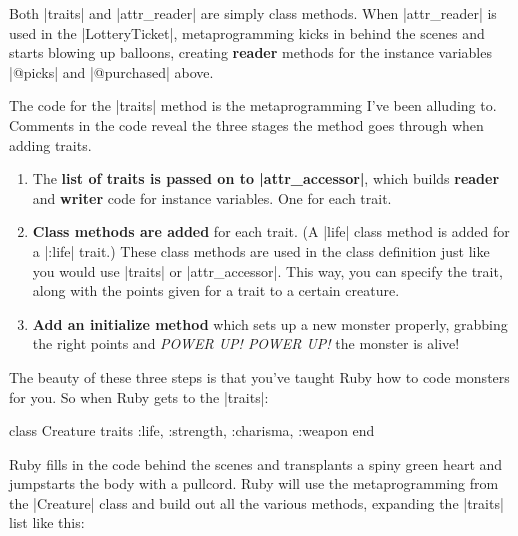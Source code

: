 \documentclass[12pt,twoside]{report}
\begin{document}
Both \rubyinline|traits| and
\rubyinline|attr_reader| are simply class methods.
When \rubyinline|attr_reader| is used in the
\rubyinline|LotteryTicket|, metaprogramming kicks in
behind the scenes and starts blowing up balloons, creating {\bf
  reader} methods for the instance variables
\rubyinline|@picks| and
\rubyinline|@purchased| above.

The code for the \rubyinline|traits| method is the
metaprogramming I've been alluding to. Comments in the code reveal the
three stages the method goes through when adding traits.

\begin{enumerate}
\item The {\bf list of traits is passed on to
  \rubyinline|attr_accessor|}, which builds {\bf
  reader} and {\bf writer} code for instance variables.  One for each
  trait.
\item {\bf Class methods are added} for each trait.  (A
  \rubyinline|life| class method is added for a
  \rubyinline|:life| trait.)  These class methods are
  used in the class definition just like you would use
  \rubyinline|traits| or
  \rubyinline|attr_accessor|.  This way, you can
  specify the trait, along with the points given for a trait to a
  certain creature.
\item {\bf Add an initialize method} which sets up a new monster
  properly, grabbing the right points and {\em POWER UP! POWER UP!}
  the monster is alive!
\end{enumerate}

The beauty of these three steps is that you've taught Ruby how to code
monsters for you.  So when Ruby gets to the
\rubyinline|traits|:


\begin{rubycode}

 class Creature
   traits :life, :strength, :charisma, :weapon
 end

\end{rubycode}


Ruby fills in the code behind the scenes and transplants a spiny green
heart and jumpstarts the body with a pullcord. Ruby will use the
metaprogramming from the \rubyinline|Creature| class
and build out all the various methods, expanding the
\rubyinline|traits| list like this:
\end{document}
